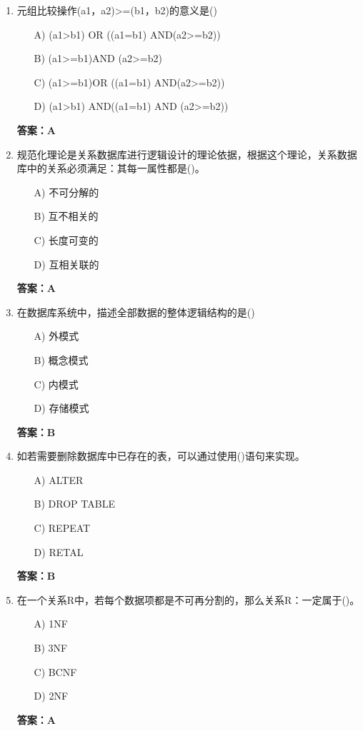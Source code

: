 \documentclass[a4paper,12pt]{article}
\begin{document}
\begin{enumerate}[label=\arabic*.]
\item 元组比较操作(a1，a2)>=(b1，b2)的意义是()
\begin{itemize}
    \item[A)] (a1>b1) OR ((a1=b1) AND(a2>=b2))
    \item[B)] (a1>=b1)AND (a2>=b2)
    \item[C)] (a1>=b1)OR ((a1=b1) AND(a2>=b2))
    \item[D)] (a1>b1) AND((a1=b1) AND (a2>=b2))
\end{itemize}
\textbf{答案：A}

\item 规范化理论是关系数据库进行逻辑设计的理论依据，根据这个理论，关系数据库中的关系必须满足：其每一属性都是()。
\begin{itemize}
    \item[A)] 不可分解的
    \item[B)] 互不相关的
    \item[C)] 长度可变的
    \item[D)] 互相关联的
\end{itemize}
\textbf{答案：A}

\item 在数据库系统中，描述全部数据的整体逻辑结构的是()
\begin{itemize}
    \item[A)] 外模式
    \item[B)] 概念模式
    \item[C)] 内模式
    \item[D)] 存储模式
\end{itemize}
\textbf{答案：B}

\item 如若需要删除数据库中已存在的表，可以通过使用()语句来实现。
\begin{itemize}
    \item[A)] ALTER
    \item[B)] DROP TABLE
    \item[C)] REPEAT
    \item[D)] RETAL
\end{itemize}
\textbf{答案：B}

\item 在一个关系R中，若每个数据项都是不可再分割的，那么关系R：一定属于()。
\begin{itemize}
    \item[A)] 1NF
    \item[B)] 3NF
    \item[C)] BCNF
    \item[D)] 2NF
\end{itemize}
\textbf{答案：A}


\end{enumerate}
\end{document}
